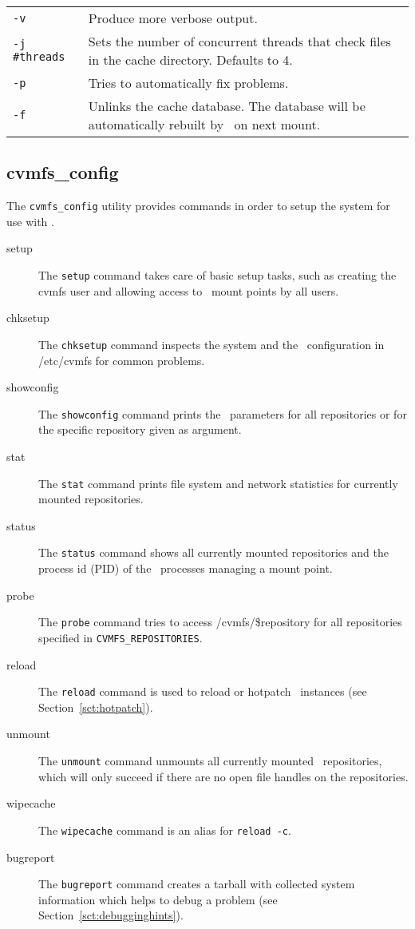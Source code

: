 \begin{tabularx}{\linewidth}{lX}
	\texttt{-v}				& Produce more verbose output.\\
	\texttt{-j \#threads}	& Sets the number of concurrent threads that check files in the cache directory. Defaults to 4. \\
	\texttt{-p} 			& Tries to automatically fix problems. \\
	\texttt{-f} 			& Unlinks the cache database.  The database will be automatically rebuilt by \cvmfs\ on next mount.\\
\end{tabularx}

\subsection{cvmfs\_config}
The \texttt{cvmfs\_config} utility provides commands in order to setup the system for use with \cvmfs.
\begin{description}
	\item[setup] The \texttt{setup} command takes care of basic setup tasks, such as creating the cvmfs user and allowing access to \cvmfs\ mount points by all users.
	\item[chksetup] The \texttt{chksetup} command inspects the system and the \cvmfs\ configuration in /etc/cvmfs for common problems.
	\item [showconfig] The \texttt{showconfig} command prints the \cvmfs\ parameters for all repositories or for the specific repository given as argument.
	\item [stat] The \texttt{stat} command prints file system and network statistics for currently mounted repositories.
	\item [status] The \texttt{status} command shows all currently mounted repositories and the process id (PID) of the \cvmfs\ processes managing a mount point.
	\item [probe] The \texttt{probe} command tries to access /cvmfs/\$repository for all repositories specified in \texttt{CVMFS\_REPOSITORIES}.
	\item [reload] The \texttt{reload} command is used to reload or hotpatch \cvmfs\ instances (see Section~\ref{sct:hotpatch}).
	\item [unmount] The \texttt{unmount} command unmounts all currently mounted \cvmfs\ repositories, which will only succeed if there are no open file handles on the repositories.
	\item [wipecache] The \texttt{wipecache} command is an alias for \texttt{reload -c}.
	\item [bugreport] The \texttt{bugreport} command creates a tarball with collected system information which helps to debug a problem (see Section~\ref{sct:debugginghints}). 
\end{description}

